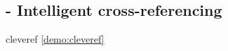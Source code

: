 
\subsection{ - Intelligent cross-referencing}

\begin{demo}{}{cleveref}
  \cref{demo:cleveref}
\end{demo}

